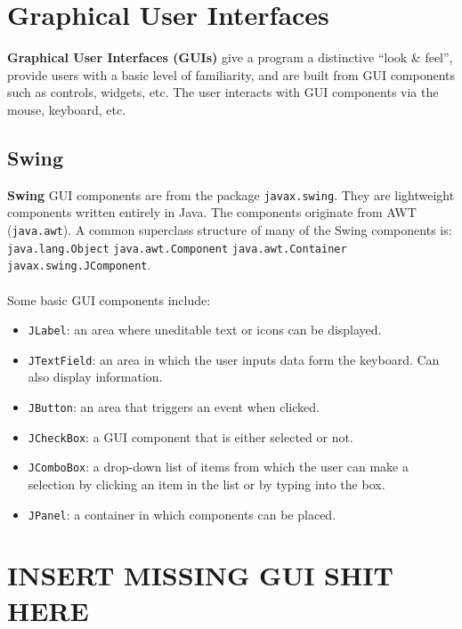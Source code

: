 \documentclass[a4paper,11pt]{article}
\begin{document}
\section{Graphical User Interfaces}
\textbf{Graphical User Interfaces (GUIs)} give a program a distinctive ``look \& feel'', provide users with 
a basic level of familiarity, and are built from GUI components such as controls, widgets, etc.
The user interacts with GUI components via the mouse, keyboard, etc.

\subsection{Swing}
\textbf{Swing} GUI components are from the package \verb|javax.swing|. 
They are lightweight components written entirely in Java.
The components originate from AWT (\verb|java.awt|).
A common superclass structure of many of the Swing components is: \verb|java.lang.Object| {\rightarrow} 
\verb|java.awt.Component| {\rightarrow} \verb|java.awt.Container| {\rightarrow} \verb|javax.swing.JComponent|.
\\\\
Some basic GUI components include:
\begin{itemize}
    \item   \verb|JLabel|: an area where uneditable text or icons can be displayed.
    \item   \verb|JTextField|: an area in which the user inputs data form the keyboard. Can also display information.
    \item   \verb|JButton|: an area that triggers an event when clicked.
    \item   \verb|JCheckBox|: a GUI component that is either selected or not.
    \item   \verb|JComboBox|: a drop-down list of items from which the user can make a selection by clicking an 
            item in the list or by typing into the box.
    \item   \verb|JPanel|: a container in which components can be placed.
\end{itemize}

\section{INSERT MISSING GUI SHIT HERE}
\end{document}
